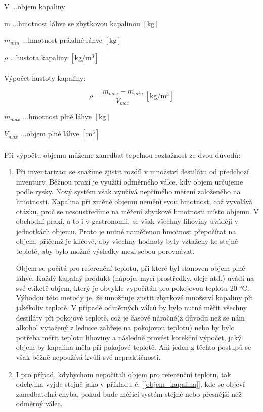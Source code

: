 V ...objem kapaliny

m ...hmotnost láhve se zbytkovou kapalinou \([\mathrm{kg}]\)

\(m_{min}\) ...hmotnost prázdné láhve \([\mathrm{kg}]\)

\(\rho\) ...hustota kapaliny \([\mathrm{kg/m^3}]\)
\\
\\
Výpočet hustoty kapaliny:

\begin{equation}
    \rho = \frac{m_{max} - m_{min}}{V_{max}} \, \left[\mathrm{kg/m^3}\right] \label{objem_kapalina}
\end{equation}


\(m_{max}\) ...hmotnost plné láhve \([\mathrm{kg}]\)

\(V_{max}\) ...objem plné láhve \([\mathrm{m^3}]\)
\\
\\
Při výpočtu objemu můžeme zanedbat tepelnou roztažnost ze dvou důvodů:
\\
\begin{enumerate}
    \item
    Při inventarizaci se snažíme zjistit rozdíl v množství destilátu od předchozí inventury. Běžnou praxí je využití odměrného válce, kdy objem určujeme podle rysky. Nový systém však využívá nepřímého měření založeného na hmotnosti. Kapalina při změně objemu nemění svou hmotnost, což vyvolává otázku, proč se nesoustředíme na měření zbytkové hmotnosti místo objemu. V obchodní praxi, a to i v gastronomii, se však všechny lihoviny uvádějí v jednotkách objemu. Proto je nutné naměřenou hmotnost přepočítat na objem, přičemž je klíčové, aby všechny hodnoty byly vztaženy ke stejné teplotě, aby bylo možné výsledky mezi sebou porovnávat.
    
    Objem se počítá pro referenční teplotu, při které byl stanoven objem plné láhve. Každý kapalný produkt (nápoje, mycí prostředky, oleje atd.) uvádí na své etiketě objem, který je obvykle vypočítán pro pokojovou teplotu 20 °C. Výhodou této metody je, že umožňuje zjistit zbytkové množství kapaliny při jakékoliv teplotě. V případě odměrných válců by bylo nutné měřit všechny destiláty při pokojové teplotě, což je časově náročné(z důvodu než se nám alkohol vytažený z lednice zahřeje na pokojovou teplotu) nebo by bylo potřeba měřit teplotu lihoviny a následně provést korekční výpočet, jaký objem by kapalina měla při pokojové teplotě. Ani jeden z těchto postupů se však běžně nepoužívá kvůli své nepraktičnosti.
    
    \item 
    I pro případ, kdybychom nepočítali objem pro referenční teplotu, tak odchylka vyjde stejně jako v příkladu č. [\ref{objem_kapalina}], kde se objeví zanedbatelná chyba, pokud bude měřicí systém stejně nebo přesnější než odměrný válec.
\end{enumerate}

